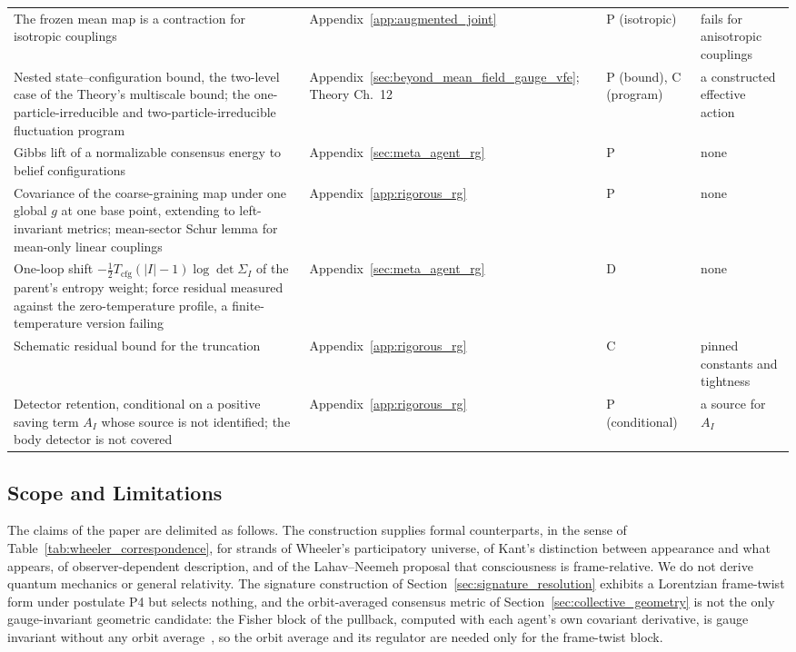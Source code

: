 \documentclass[11pt]{article}
\begin{document}
{\begin{longtable}{@{}>{\raggedright\arraybackslash}p{}>{\raggedright\arraybackslash}p{}>{\raggedright\arraybackslash}p{}>{\raggedright\arraybackslash}p{}@{}}
The frozen mean map is a contraction for isotropic couplings & Appendix~\ref{app:augmented_joint} & P (isotropic) & fails for anisotropic couplings \\
Nested state--configuration bound, the two-level case of the Theory's multiscale bound; the one-particle-irreducible and two-particle-irreducible fluctuation program & Appendix~\ref{sec:beyond_mean_field_gauge_vfe}; Theory Ch.~12 & P (bound), C (program) & a constructed effective action \\
Gibbs lift of a normalizable consensus energy to belief configurations & Appendix~\ref{sec:meta_agent_rg} & P & none \\
Covariance of the coarse-graining map under one global $g$ at one base point, extending to left-invariant metrics; mean-sector Schur lemma for mean-only linear couplings & Appendix~\ref{app:rigorous_rg} & P & none \\
One-loop shift $-\tfrac12 T_{\mathrm{cfg}}(|I|-1)\log\det\Sigma_I$ of the parent's entropy weight; force residual measured against the zero-temperature profile, a finite-temperature version failing & Appendix~\ref{sec:meta_agent_rg} & D & none \\
Schematic residual bound for the truncation & Appendix~\ref{app:rigorous_rg} & C & pinned constants and tightness \\
Detector retention, conditional on a positive saving term $A_I$ whose source is not identified; the body detector is not covered & Appendix~\ref{app:rigorous_rg} & P (conditional) & a source for $A_I$ \\
\end{longtable}
}

\subsection{Scope and Limitations}\label{sec:scope_limitations}

The claims of the paper are delimited as follows. The construction supplies formal counterparts, in the sense of Table~\ref{tab:wheeler_correspondence}, for strands of Wheeler's participatory universe, of Kant's distinction between appearance and what appears, of observer-dependent description, and of the Lahav--Neemeh proposal that consciousness is frame-relative. We do not derive quantum mechanics or general relativity. The signature construction of Section~\ref{sec:signature_resolution} exhibits a Lorentzian frame-twist form under postulate P4 but selects nothing, and the orbit-averaged consensus metric of Section~\ref{sec:collective_geometry} is not the only gauge-invariant geometric candidate: the Fisher block of the pullback, computed with each agent's own covariant derivative, is gauge invariant without any orbit average~\cite[Ch.~B2]{DennisGaugeVFESuppB2026}, so the orbit average and its regulator are needed only for the frame-twist block.
\end{document}
